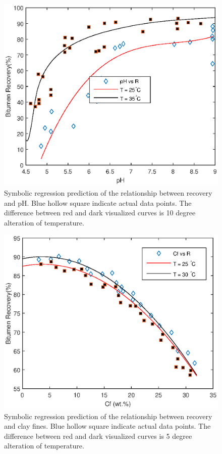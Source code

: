 \documentclass[10pt,journal,compsoc]{IEEEtran}
\begin{document}
    \begin{figure}[tb]
         \centering
         \includegraphics[width=\linewidth,clip]{ph_comparison.eps}
         \vspace{-2em}
                  \caption{Symbolic regression prediction of the relationship between recovery and pH. Blue hollow square indicate actual data points. The difference between red and dark visualized curves is 10 degree alteration of temperature.}
         \label{fig:ph_comparison.png}
    \end{figure}
    
        \begin{figure}[tb]
        	\centering
        	\includegraphics[width=\linewidth,clip]{Cf_comparison.eps}
        	\vspace{-2em}
        	\caption{Symbolic regression prediction of the relationship between recovery and clay fines. Blue hollow square indicate actual data points. The difference between red and dark visualized curves is 5 degree alteration of temperature. }
        	\label{fig:Cf_comparison.png}
        \end{figure}
  
\end{document}
